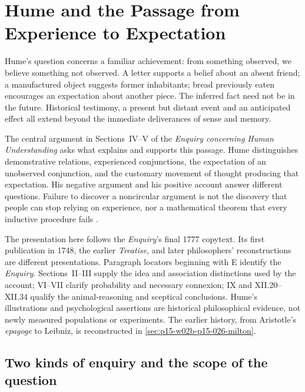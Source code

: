 \chapter{Hume and the Passage from Experience to Expectation}
\label{sec:p15-hume-and-the-problem-of-induction}

Hume's question concerns a familiar achievement: from something observed,
we believe something not observed. A letter supports a belief about an
absent friend; a manufactured object suggests former inhabitants; bread
previously eaten encourages an expectation about another piece. The
inferred fact need not be in the future. Historical testimony, a present
but distant event and an anticipated effect all extend beyond the immediate
deliverances of sense and memory.

The central argument in Sections~IV--V of the \emph{Enquiry concerning
Human Understanding} asks what explains and supports this passage.
Hume distinguishes demonstrative relations, experienced conjunctions,
the expectation of an unobserved conjunction, and the customary movement
of thought producing that expectation. His negative argument and his
positive account answer different questions. Failure to discover a
noncircular argument is not the discovery that people can stop relying
on experience, nor a mathematical theorem that every inductive procedure
fails \parencite[E~4.3--4.5, 4.14--4.23, 5.1--5.9]{Hume1777EnquiryHTO}.

The presentation here follows the \emph{Enquiry}'s final 1777 copytext.
Its first publication in 1748, the earlier \emph{Treatise}, and later
philosophers' reconstructions are different presentations. Paragraph
locators beginning with E identify the \emph{Enquiry}. Sections~II--III
supply the idea and association distinctions used by the account;
VI--VII clarify probability and necessary connexion; IX and
XII.20--XII.34 qualify the animal-reasoning and sceptical conclusions.
Hume's illustrations and psychological assertions are historical
philosophical evidence, not newly measured populations or experiments.
The earlier history, from Aristotle's \emph{epagoge} to Leibniz, is
reconstructed in \cref{sec:p15-w02b-p15-026-milton}.

\section{Two kinds of enquiry and the scope of the question}
\label{sec:p15-hume-fork}


